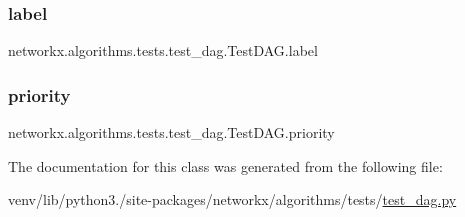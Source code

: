 \subsubsection{\texorpdfstring{label}{label}}
{\footnotesize\ttfamily networkx.\+algorithms.\+tests.\+test\+\_\+dag.\+Test\+D\+A\+G.\+label}

\mbox{\label{classnetworkx_1_1algorithms_1_1tests_1_1test__dag_1_1TestDAG_ac9267c9a661e0a87e088e668318e04a3}} 
\subsubsection{\texorpdfstring{priority}{priority}}
{\footnotesize\ttfamily networkx.\+algorithms.\+tests.\+test\+\_\+dag.\+Test\+D\+A\+G.\+priority}



The documentation for this class was generated from the following file\+:\begin{DoxyCompactItemize}
\item 
venv/lib/python3./site-\/packages/networkx/algorithms/tests/\hyperlink{test__dag_8py}{test\+\_\+dag.\+py}\end{DoxyCompactItemize}

